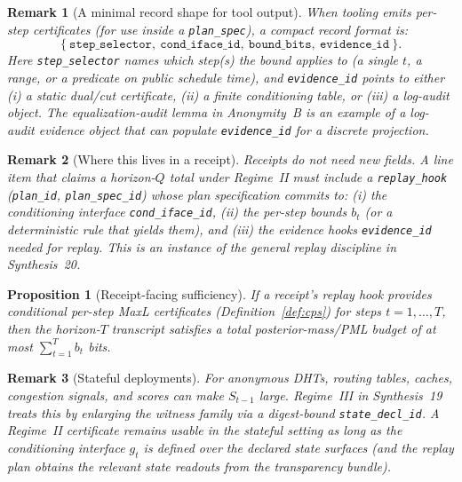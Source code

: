 \documentclass[11pt]{article}
\newtheorem{proposition}{Proposition}
\newtheorem{remark}{Remark}
\begin{document}
\begin{remark}[A minimal record shape for tool output]
When tooling emits per-step certificates (for use inside a \texttt{plan\_spec}), a compact record format is:
\[
\{\ \texttt{step\_selector},\ \texttt{cond\_iface\_id},\ \texttt{bound\_bits},\ \texttt{evidence\_id}\ \}.
\]
Here \texttt{step\_selector} names which step(s) the bound applies to (a single $t$, a range, or a predicate on public schedule time), and \texttt{evidence\_id} points to either (i) a static dual/cut certificate, (ii) a finite conditioning table, or (iii) a log-audit object.
The equalization-audit lemma in Anonymity~B is an example of a log-audit evidence object that can populate \texttt{evidence\_id} for a discrete projection.\cite{series:profiling}
\end{remark}



\begin{remark}[Where this lives in a receipt]
Receipts do \emph{not} need new fields.
A line item that claims a horizon-$Q$ total under Regime~II must include a \texttt{replay\_hook}
(\texttt{plan\_id}, \texttt{plan\_spec\_id}) whose plan specification commits to:
(i) the conditioning interface \texttt{cond\_iface\_id},
(ii) the per-step bounds $b_t$ (or a deterministic rule that yields them), and
(iii) the evidence hooks \texttt{evidence\_id} needed for replay.
This is an instance of the general replay discipline in Synthesis~20.\cite{series:auditorreplay}
\end{remark}

\begin{proposition}[Receipt-facing sufficiency]\label{prop:suff}
If a receipt's replay hook provides conditional per-step MaxL certificates (Definition~\ref{def:cps}) for steps $t=1,\dots,T$,
then the horizon-$T$ transcript satisfies a total posterior-mass/PML budget of at most $\sum_{t=1}^T b_t$ bits.
\end{proposition}

\begin{remark}[Stateful deployments]
For anonymous DHTs, routing tables, caches, congestion signals, and scores can make $S_{t-1}$ large.
Regime~III in Synthesis~19 treats this by enlarging the witness family via a digest-bound \texttt{state\_decl\_id}.\cite{series:accountingrulebook,series:planstateequiv}
A Regime~II certificate remains usable in the stateful setting as long as the conditioning interface $g_t$ is defined over the declared state surfaces
(and the replay plan obtains the relevant state readouts from the transparency bundle).
\end{remark}
\end{document}
